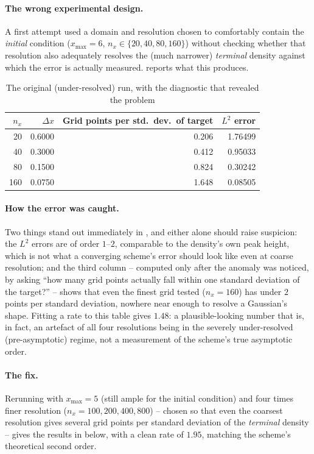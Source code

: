 \documentclass[11pt]{article}
\theoremstyle{remark}
\begin{document}
\paragraph{The wrong experimental design.} A first attempt used a domain and
resolution chosen to comfortably contain the \emph{initial} condition
($x_{\max}=6$, $n_x\in\{20,40,80,160\}$) without checking whether that resolution
also adequately resolves the (much narrower) \emph{terminal} density against which
the error is actually measured.  reports what this produces.

\begin{table}[ht]
\centering
\caption{The original (under-resolved) run, with the diagnostic that revealed the
problem}
\label{tab:fd-bug}
\begin{tabular}{rrrr}
\toprule
$n_x$ & $\Delta x$ & Grid points per std.\ dev.\ of target & $L^2$ error \\
\midrule
20  & 0.6000 & 0.206 & 1.76499 \\
40  & 0.3000 & 0.412 & 0.95033 \\
80  & 0.1500 & 0.824 & 0.30242 \\
160 & 0.0750 & 1.648 & 0.08505 \\
\bottomrule
\end{tabular}
\end{table}

\paragraph{How the error was caught.} Two things stand out immediately in
, and either alone should raise suspicion: the $L^2$ errors are
of order $1$--$2$, comparable to the density's own peak height, which is not what
a converging scheme's error should look like even at coarse resolution; and the
third column -- computed only after the anomaly was noticed, by asking ``how many
grid points actually fall within one standard deviation of the target?'' -- shows
that even the finest grid tested ($n_x=160$) has under $2$ points per standard
deviation, nowhere near enough to resolve a Gaussian's shape. Fitting a rate to
this table gives $1.48$: a plausible-looking number that is, in fact, an artefact
of all four resolutions being in the severely under-resolved (pre-asymptotic)
regime, not a measurement of the scheme's true asymptotic order.

\paragraph{The fix.} Rerunning with $x_{\max}=5$ (still ample for the initial
condition) and four times finer resolution ($n_x=100,200,400,800$) -- chosen so
that even the coarsest resolution gives several grid points per standard
deviation of the \emph{terminal} density -- gives the results in
 below, with a clean rate of $1.95$, matching the scheme's
theoretical second order.
\end{document}
